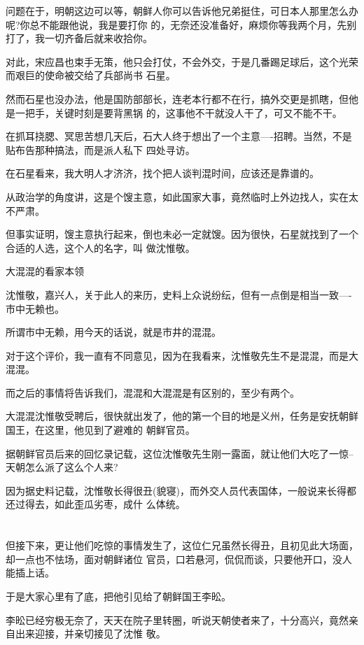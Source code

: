 \documentclass[11pt,a4paper,onecolumn]{article}
\begin{document}
问题在于，明朝这边可以等，朝鲜人你可以告诉他兄弟挺住，可日本人那里怎么办呢?你总不能跟他说，我是要打你
的，无奈还没准备好，麻烦你等我两个月，先别打了，我一切齐备后就来收拾你。

对此，宋应昌也束手无策，他只会打仗，不会外交，于是几番踢足球后，这个光荣而艰巨的使命被交给了兵部尚书
石星。

然而石星也没办法，他是国防部部长，连老本行都不在行，搞外交更是抓瞎，但他是一把手，关键时刻是要背黑锅
的，这事他不干就没人干了，可又不能不干。

在抓耳挠腮、冥思苦想几天后，石大人终于想出了一个主意----招聘。当然，不是贴布告那种搞法，而是派人私下
四处寻访。

在石星看来，我大明人才济济，找个把人谈判混时间，应该还是靠谱的。

从政治学的角度讲，这是个馊主意，如此国家大事，竟然临时上外边找人，实在太不严肃。

但事实证明，馊主意执行起来，倒也未必一定就馊。因为很快，石星就找到了一个合适的人选，这个人的名字，叫
做沈惟敬。

大混混的看家本领

沈惟敬，嘉兴人，关于此人的来历，史料上众说纷纭，但有一点倒是相当一致----市中无赖也。

所谓市中无赖，用今天的话说，就是市井的混混。

对于这个评价，我一直有不同意见，因为在我看来，沈惟敬先生不是混混，而是大混混。

而之后的事情将告诉我们，混混和大混混是有区别的，至少有两个。

大混混沈惟敬受聘后，很快就出发了，他的第一个目的地是义州，任务是安抚朝鲜国王，在这里，他见到了避难的
朝鲜官员。

据朝鲜官员后来的回忆录记载，这位沈惟敬先生刚一露面，就让他们大吃了一惊--天朝怎么派了这么个人来?

因为据史料记载，沈惟敬长得很丑(貌寝)，而外交人员代表国体，一般说来长得都还过得去，如此歪瓜劣枣，成什
么体统。

\section[\thesection]{}

但接下来，更让他们吃惊的事情发生了，这位仁兄虽然长得丑，且初见此大场面，却一点也不怯场，面对朝鲜诸位
官员，口若悬河，侃侃而谈，只要他开口，没人能插上话。

于是大家心里有了底，把他引见给了朝鲜国王李昖。

李昖已经穷极无奈了，天天在院子里转圈，听说天朝使者来了，十分高兴，竟然亲自出来迎接，并亲切接见了沈惟
敬。
\end{document}
